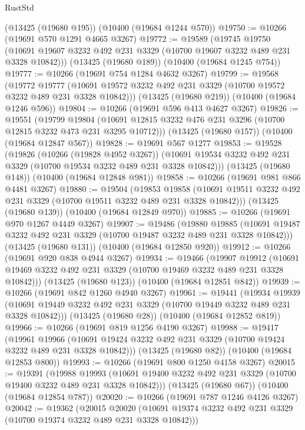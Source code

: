 \begin{lexlean}{RustStd}
\begin{coremodule}
    (@13425 (@19680 @195))
    (@10400 (@19684 @1244 @570))
@19750 := @10266 (@19691 @570 @1291 @4665 @3267)
@19772 := @19589
    (@19745
      @19750
      (@10691 @19607 @3232 @492 @231 @3329 (@10700 @19607 @3232 @489 @231 @3328 @10842)))
    (@13425 (@19680 @189))
    (@10400 (@19684 @1245 @754))
@19777 := @10266 (@19691 @754 @1284 @4632 @3267)
@19799 := @19568
    (@19772
      @19777
      (@10691 @19572 @3232 @492 @231 @3329 (@10700 @19572 @3232 @489 @231 @3328 @10842)))
    (@13425 (@19680 @219))
    (@10400 (@19684 @1246 @596))
@19804 := @10266 (@19691 @596 @413 @4627 @3267)
@19826 := @19551
    (@19799
      @19804
      (@10691 @12815 @3232 @476 @231 @3296 (@10700 @12815 @3232 @473 @231 @3295 @10712)))
    (@13425 (@19680 @157))
    (@10400 (@19684 @12847 @567))
@19828 := @19691 @567 @1277
@19853 := @19528
    (@19826
      (@10266 (@19828 @4952 @3267))
      (@10691 @19534 @3232 @492 @231 @3329 (@10700 @19534 @3232 @489 @231 @3328 @10842)))
    (@13425 (@19680 @148))
    (@10400 (@19684 @12848 @981))
@19858 := @10266 (@19691 @981 @866 @4481 @3267)
@19880 := @19504
    (@19853
      @19858
      (@10691 @19511 @3232 @492 @231 @3329 (@10700 @19511 @3232 @489 @231 @3328 @10842)))
    (@13425 (@19680 @139))
    (@10400 (@19684 @12849 @970))
@19885 := @10266 (@19691 @970 @1267 @4449 @3267)
@19907 := @19486
    (@19880
      @19885
      (@10691 @19487 @3232 @492 @231 @3329 (@10700 @19487 @3232 @489 @231 @3328 @10842)))
    (@13425 (@19680 @131))
    (@10400 (@19684 @12850 @920))
@19912 := @10266 (@19691 @920 @838 @4944 @3267)
@19934 := @19466
    (@19907
      @19912
      (@10691 @19469 @3232 @492 @231 @3329 (@10700 @19469 @3232 @489 @231 @3328 @10842)))
    (@13425 (@19680 @123))
    (@10400 (@19684 @12851 @842))
@19939 := @10266 (@19691 @842 @1260 @4940 @3267)
@19961 := @19441
    (@19934
      @19939
      (@10691 @19449 @3232 @492 @231 @3329 (@10700 @19449 @3232 @489 @231 @3328 @10842)))
    (@13425 (@19680 @28))
    (@10400 (@19684 @12852 @819))
@19966 := @10266 (@19691 @819 @1256 @4190 @3267)
@19988 := @19417
    (@19961
      @19966
      (@10691 @19424 @3232 @492 @231 @3329 (@10700 @19424 @3232 @489 @231 @3328 @10842)))
    (@13425 (@19680 @82))
    (@10400 (@19684 @12853 @800))
@19993 := @10266 (@19691 @800 @1250 @4158 @3267)
@20015 := @19391
    (@19988
      @19993
      (@10691 @19400 @3232 @492 @231 @3329 (@10700 @19400 @3232 @489 @231 @3328 @10842)))
    (@13425 (@19680 @67))
    (@10400 (@19684 @12854 @787))
@20020 := @10266 (@19691 @787 @1246 @4126 @3267)
@20042 := @19362
    (@20015
      @20020
      (@10691 @19374 @3232 @492 @231 @3329 (@10700 @19374 @3232 @489 @231 @3328 @10842)))

\end{coremodule}
\end{lexlean}
